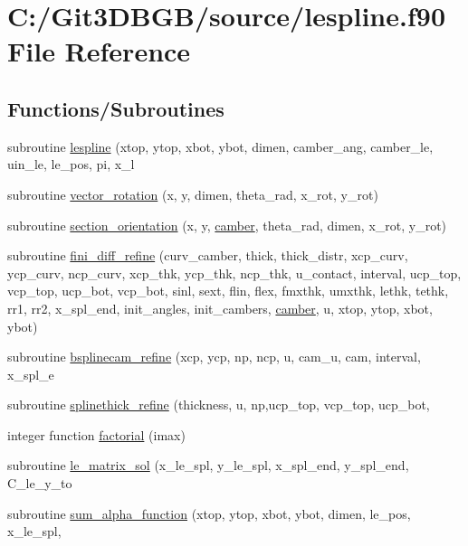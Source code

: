 \hypertarget{lespline_8f90}{}\section{C\+:/\+Git3\+D\+B\+G\+B/source/lespline.f90 File Reference}
\label{lespline_8f90}
\subsection*{Functions/\+Subroutines}
\begin{DoxyCompactItemize}
\item 
subroutine \hyperlink{lespline_8f90_a910565d05a6f5186890fa2002ee0f3d6}{lespline} (xtop, ytop, xbot, ybot, dimen,                                                     camber\+\_\+ang, camber\+\_\+le, uin\+\_\+le, le\+\_\+pos, pi, x\+\_\+l
\item 
subroutine \hyperlink{lespline_8f90_a4b77dc5a915f06c52c632e253dbeba5b}{vector\+\_\+rotation} (x, y, dimen, theta\+\_\+rad, x\+\_\+rot, y\+\_\+rot)
\item 
subroutine \hyperlink{lespline_8f90_a9f1575aba3ce85edb6fe922150251bcc}{section\+\_\+orientation} (x, y, \hyperlink{bsplinecam_8f90_a5f344dd1ac7aa0679039a2bd0531aec6}{camber}, theta\+\_\+rad, dimen, x\+\_\+rot, y\+\_\+rot)
\item 
subroutine \hyperlink{lespline_8f90_a7128d571695c622aff1e7e1cd5ce4619}{fini\+\_\+diff\+\_\+refine} (curv\+\_\+camber, thick, thick\+\_\+distr,   xcp\+\_\+curv, ycp\+\_\+curv, ncp\+\_\+curv, xcp\+\_\+thk, ycp\+\_\+thk, ncp\+\_\+thk,   u\+\_\+contact, interval,   ucp\+\_\+top, vcp\+\_\+top, ucp\+\_\+bot, vcp\+\_\+bot,   sinl, sext, flin, flex, fmxthk, umxthk, lethk, tethk,   rr1, rr2,   x\+\_\+spl\+\_\+end, init\+\_\+angles, init\+\_\+cambers, \hyperlink{bsplinecam_8f90_a5f344dd1ac7aa0679039a2bd0531aec6}{camber}, u,   xtop, ytop, xbot, ybot)
\item 
subroutine \hyperlink{lespline_8f90_accf5f109c904f84a99a5ff98f9e81985}{bsplinecam\+\_\+refine} (xcp, ycp, np, ncp, u, cam\+\_\+u, cam, interval, x\+\_\+spl\+\_\+e
\item 
subroutine \hyperlink{lespline_8f90_aab54ab4bcec582541576e1500659f46f}{splinethick\+\_\+refine} (thickness, u, np,ucp\+\_\+top, vcp\+\_\+top, ucp\+\_\+bot,
\item 
integer function \hyperlink{lespline_8f90_a04fd0ef8a1de2e0acf51adbdcbf03197}{factorial} (imax)
\item 
subroutine \hyperlink{lespline_8f90_a860fbe4fa64fd5f40eaa161c86c70826}{le\+\_\+matrix\+\_\+sol} (x\+\_\+le\+\_\+spl, y\+\_\+le\+\_\+spl, x\+\_\+spl\+\_\+end, y\+\_\+spl\+\_\+end, C\+\_\+le\+\_\+y\+\_\+to
\item 
subroutine \hyperlink{lespline_8f90_ade014f34765a71df4c694a41bd94932a}{sum\+\_\+alpha\+\_\+function} (xtop, ytop, xbot, ybot, dimen, le\+\_\+pos, x\+\_\+le\+\_\+spl,
\end{DoxyCompactItemize}


